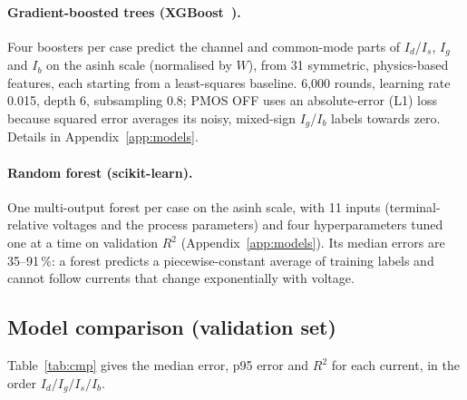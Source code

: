 \documentclass[11pt,a4paper]{article}
\begin{document}
\paragraph{Gradient-boosted trees (XGBoost~\cite{xgboost}).} Four boosters per case predict the channel
and common-mode parts of $I_d$/$I_s$, $I_g$ and $I_b$ on the asinh scale (normalised by $W$), from 31
symmetric, physics-based features, each starting from a least-squares baseline. 6,000 rounds, learning
rate 0.015, depth 6, subsampling 0.8; PMOS OFF uses an absolute-error (L1) loss because squared error
averages its noisy, mixed-sign $I_g$/$I_b$ labels towards zero. Details in Appendix~\ref{app:models}.

\paragraph{Random forest (scikit-learn).} One multi-output forest per case on the asinh scale, with 11
inputs (terminal-relative voltages and the process parameters) and four hyperparameters tuned one at a
time on validation $R^2$ (Appendix~\ref{app:models}). Its median errors are 35--91\,\%: a forest
predicts a piecewise-constant average of training labels and cannot follow currents that change
exponentially with voltage.

\subsection{Model comparison (validation set)}
Table~\ref{tab:cmp} gives the median error, p95 error and $R^2$ for each current, in the order
$I_d / I_g / I_s / I_b$.
\end{document}
